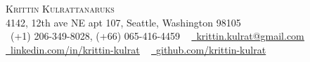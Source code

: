 \documentclass[letterpaper,11pt]{article}
\begin{document}

\begin{center}
    {\Huge \scshape Krittin Kulrattanaruks} \\ \vspace{1pt}
    4142, 12th ave NE apt 107, Seattle, Washington 98105 \\ \vspace{1pt}
    \small \raisebox{-0.1\height}\faPhone\ (+1) 206-349-8028, (+66) 065-416-4459 ~ \href{mailto:krittin.kulrat@gmail.com}{\raisebox{-0.2\height}\faEnvelope\  \underline{krittin.kulrat@gmail.com}}~ 
    \\ \vspace{1pt} \href{https://www.linkedin.com/in/krittin-kulrat/}{\raisebox{-0.2\height}\faLinkedin\ \underline{linkedin.com/in/krittin-kulrat}}  ~
    \href{https://github.com/krittin-kulrat}{\raisebox{-0.2\height}\faGithub\ \underline{github.com/krittin-kulrat}}
    \vspace{-8pt}
\end{center}


\end{document}
